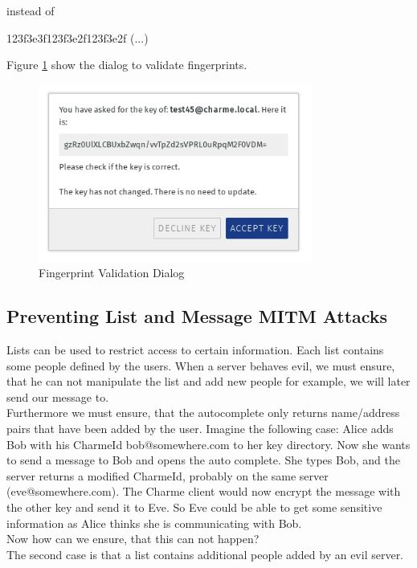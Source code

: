 \documentclass{scrartcl}
\begin{document}
  instead of 
  
  \begin{center}
  123f3e3f123f3e2f123f3e2f (...)
  \end{center}
  
  
  Figure \ref{figFP} show the dialog to validate fingerprints.
  \begin{figure}[ht]
	\centering
  \includegraphics[width=90mm]{illustrations/fingerprint.png}
	\caption{Fingerprint Validation Dialog}
	\label{figFP}
\end{figure}



  
\subsection{Preventing List and Message MITM Attacks}
Lists can be used to restrict access to certain information. Each list contains some people defined by the users. When a server behaves evil, we must ensure, that he can not manipulate the list and add new people for example, we will later send our message to.\\
  
 Furthermore we must ensure, that the autocomplete only returns name/address pairs that have been added by the user. Imagine the following case: Alice adds Bob with his CharmeId bob@somewhere.com to her key directory. Now she wants to send a message to Bob and opens the auto complete. She types Bob, and the server returns a modified CharmeId, probably on the same server (eve@somewhere.com). The Charme client would now encrypt the message with the other key and send it to Eve. So Eve could be able to get some sensitive information as Alice thinks she is communicating with Bob.\\

Now how can we ensure, that this can not happen?
\\
The second case is that a list contains additional people added by an evil server.
\end{document}
